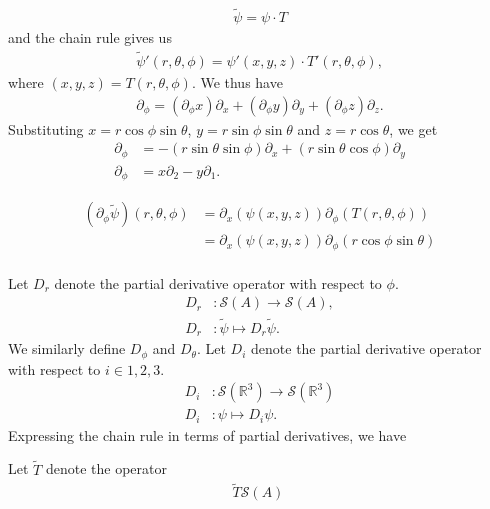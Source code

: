 \documentclass[12pt, a4 paper]{article}
\theoremstyle{definition}
\newcommand{\rr}{\mathbb{R}}
\newcommand{\schwartz}{\mathcal{S}}
\newcommand{\schwartzrthree}{\schwartz(\rr^3)}
\begin{document}
	\begin{align*}
		\tilde{\psi} = \psi \cdot T
	\end{align*}
	and the chain rule gives us
	\begin{align*}
	    \tilde{\psi}'(r, \theta, \phi) = \psi'(x,y,z) \cdot T'(r, \theta, \phi),
	\end{align*}
	where $(x,y,z) = T(r, \theta, \phi)$. We thus have
	\begin{align*}
	    \partial_\phi = (\partial_\phi x)\partial_x + (\partial_\phi y)\partial_y + (\partial_\phi z)\partial_z.
	\end{align*}
	Substituting $x = r \cos{\phi} \sin{\theta}$, $y = r \sin{\phi} \sin{\theta}$ and $z = r \cos{\theta}$, we get
	\begin{align*}
		\partial_\phi &= -(r \sin{\theta} \sin{\phi})\partial_x + (r \sin{\theta} \cos{\phi})\partial_y\\
		\partial_\phi &= x\partial_2 - y\partial_1.
	\end{align*}



	\begin{align*}
		(\partial_\phi \tilde{\psi})(r, \theta, \phi) &= \partial_x (\psi(x, y, z)) \partial_\phi(T(r, \theta, \phi))\\
		&= \partial_x (\psi(x, y, z)) \partial_\phi(r\cos{\phi}\sin{\theta})\\
	\end{align*}




	Let $D_r$ denote the partial derivative operator with respect to $\phi$.
	\begin{align*}
	    D_r &\colon \schwartz(A) \rightarrow \schwartz(A),\\
		D_r &\colon \tilde{\psi} \mapsto D_r\tilde{\psi}.
	\end{align*}
	We similarly define $D_\phi$ and $D_\theta$. Let $D_i$ denote the partial derivative operator with respect to $i \in {1, 2, 3}$.
	\begin{align*}
		D_i &\colon \schwartzrthree \rightarrow \schwartzrthree\\
		D_i &\colon \psi \mapsto D_i\psi.
	\end{align*}
	Expressing the chain rule in terms of partial derivatives, we have







	Let $\tilde{T}$ denote the operator
	\begin{align*}
		\tilde{T} \schwartz(A) \
	\end{align*}
\end{document}

